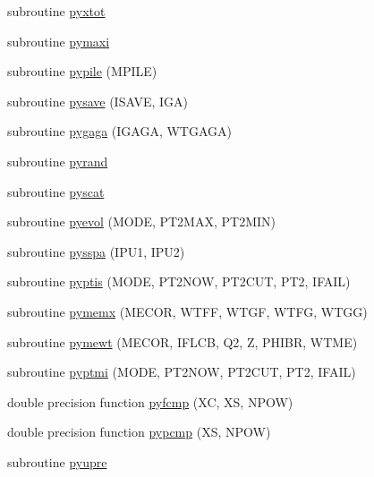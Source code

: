 \begin{DoxyCompactItemize}
\item 
subroutine \hyperlink{pythia-6_84_824_8f_aefa74679a96bc60a9275508c987b41ee}{pyxtot}
\item 
subroutine \hyperlink{pythia-6_84_824_8f_aa9cb6f1467302508501201a0e38959d1}{pymaxi}
\item 
subroutine \hyperlink{pythia-6_84_824_8f_af371bb9349e270ffd2a614762869f11c}{pypile} (M\+P\+I\+L\+E)
\item 
subroutine \hyperlink{pythia-6_84_824_8f_a0a7b951601d4f220cf0c8e93b43d2f79}{pysave} (I\+S\+A\+V\+E, I\+G\+A)
\item 
subroutine \hyperlink{pythia-6_84_824_8f_ae0f16bcefd12eb1fa5d163c95050c8bb}{pygaga} (I\+G\+A\+G\+A, W\+T\+G\+A\+G\+A)
\item 
subroutine \hyperlink{pythia-6_84_824_8f_a2d74d5dd64881524212b3720af2696de}{pyrand}
\item 
subroutine \hyperlink{pythia-6_84_824_8f_a421f30ce6ae114439ec80e4acd031139}{pyscat}
\item 
subroutine \hyperlink{pythia-6_84_824_8f_a15448b25c4eb515f33e35f86f376af68}{pyevol} (M\+O\+D\+E, P\+T2\+M\+A\+X, P\+T2\+M\+I\+N)
\item 
subroutine \hyperlink{pythia-6_84_824_8f_a9f8a08b43157ca5aa62d84247ff26109}{pysspa} (I\+P\+U1, I\+P\+U2)
\item 
subroutine \hyperlink{pythia-6_84_824_8f_ac00de061be805868aa61d626239f5fa9}{pyptis} (M\+O\+D\+E, P\+T2\+N\+O\+W, P\+T2\+C\+U\+T, P\+T2, I\+F\+A\+I\+L)
\item 
subroutine \hyperlink{pythia-6_84_824_8f_a2f7ebe82da0d6aa3faf81aba70d6f832}{pymemx} (M\+E\+C\+O\+R, W\+T\+F\+F, W\+T\+G\+F, W\+T\+F\+G, W\+T\+G\+G)
\item 
subroutine \hyperlink{pythia-6_84_824_8f_a15360bfe935dfa4b14c89715a3425579}{pymewt} (M\+E\+C\+O\+R, I\+F\+L\+C\+B, Q2, Z, P\+H\+I\+B\+R, W\+T\+M\+E)
\item 
subroutine \hyperlink{pythia-6_84_824_8f_af1b5061d1d80462745ef6b9ab52500f2}{pyptmi} (M\+O\+D\+E, P\+T2\+N\+O\+W, P\+T2\+C\+U\+T, P\+T2, I\+F\+A\+I\+L)
\item 
double precision function \hyperlink{pythia-6_84_824_8f_a40c4a6998ba33195decba0c36a8c74fe}{pyfcmp} (X\+C, X\+S, N\+P\+O\+W)
\item 
double precision function \hyperlink{pythia-6_84_824_8f_a798f90cb9dfdd7ac82ec4df67aa3c137}{pypcmp} (X\+S, N\+P\+O\+W)
\item 
subroutine \hyperlink{pythia-6_84_824_8f_aa4d454c4c02cf4ee69ed1e8031b9ad8b}{pyupre}
\item 

\end{DoxyCompactItemize}
